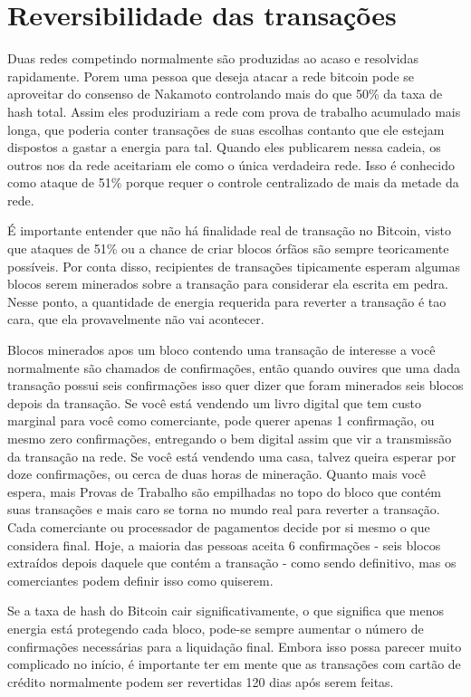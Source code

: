 \section*{Reversibilidade das transações}

Duas redes competindo normalmente são produzidas ao acaso e resolvidas rapidamente.
Porem uma pessoa que deseja atacar a rede bitcoin pode se aproveitar do consenso de Nakamoto controlando mais do que 50\% da taxa de hash total.
Assim eles produziriam a rede com prova de trabalho acumulado mais longa, que poderia conter transações de suas escolhas contanto que ele estejam dispostos a gastar a energia para tal. 
Quando eles publicarem nessa cadeia, os outros nos da rede aceitariam ele como o única verdadeira rede. 
Isso é conhecido como ataque de 51\% porque requer o controle centralizado de  mais da metade da rede.

É importante entender que não há finalidade real de transação no Bitcoin, visto que ataques de 51\% ou a chance de criar blocos órfãos são sempre teoricamente possíveis.
Por conta disso, recipientes de transações tipicamente esperam algumas blocos serem minerados sobre a transação para considerar ela escrita em pedra.
Nesse ponto, a quantidade de energia requerida para reverter a transação é tao cara, que ela provavelmente não vai acontecer.

Blocos minerados apos um bloco contendo uma transação de interesse a você normalmente são chamados de confirmações, então quando ouvires que uma dada transação possui seis confirmações isso quer dizer que foram minerados seis blocos depois da transação. 
Se você está vendendo um livro digital que tem custo marginal para você como comerciante, pode querer apenas 1 confirmação, ou mesmo zero confirmações, entregando o bem digital assim que vir a transmissão da transação na rede. 
Se você está vendendo uma casa, talvez queira esperar por doze confirmações, ou cerca de duas horas de mineração.
Quanto mais você espera, mais Provas de Trabalho são empilhadas no topo do bloco que contém suas transações e mais caro se torna no mundo real para reverter a transação.
Cada comerciante ou processador de pagamentos decide por si mesmo o que considera final. 
Hoje, a maioria das pessoas aceita 6 confirmações - seis blocos extraídos depois daquele que contém a transação - como sendo definitivo, mas os comerciantes podem definir isso como quiserem.

Se a taxa de hash do Bitcoin cair significativamente, o que significa que menos energia está protegendo cada bloco, pode-se sempre aumentar o número de confirmações necessárias para a liquidação final.
Embora isso possa parecer muito complicado no início, é importante ter em mente que as transações com cartão de crédito normalmente podem ser revertidas 120 dias após serem feitas.

